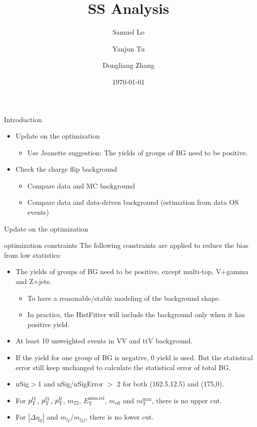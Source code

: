 \documentclass[mathserif,serif]{beamer}
\title[]{SS Analysis}
\author[]
{
Samuel Lo \inst{1}
\and
Yanjun Tu  \inst{1}
\and
Dongliang Zhang  \inst{2}
}
\institute[]
{
\inst{1}
The University of Hong Kong
\and
\inst{2}
University of Michigan
}
\date[]{\today}
\begin{document}
\frame{\titlepage}

\begin{frame}{Introduction}
\begin{itemize}
\item Update on the optimization
\begin{itemize}
\item Use Jeanette suggestion: The yields of groups of BG need to be positive.
\end{itemize}
\item Check the charge flip background
\begin{itemize}
\item Compare data and MC background
\item Compare data and data-driven background (estimation from data OS events)
\end{itemize}
\end{itemize}
\end{frame}

\begin{frame}
\begin{center}
\huge
Update on the optimization
\end{center}
\end{frame}

\begin{frame}{optimization constraints}
\small
The following constraints are applied to reduce the bias from low statistics:
\begin{itemize}
\small
\item The yields of groups of BG need to be positive, except multi-top, V+gamma and Z+jets.
\begin{itemize}
\item To have a reasonable/stable modeling of the background shape.
\item In practice, the HistFitter will include the background only when it has positive yield.
\end{itemize}
\item At least 10 unweighted events in VV and ttV background.
\item If the yield for one group of BG is negative, 0 yield is used. But the statistical error still keep unchanged to calculate the statistical error of total BG.
\item nSig$>$1 and nSig/nSigError $>$ 2 for both (162.5,12.5) and (175,0).
\item For $p_{\text{T}}^{l1}$, $p_{\text{T}}^{l1}$, $p_{\text{T}}^{ll}$, $m_{T2}$, $E_{\text{T}}^{\text{miss,rel}}$, $m_{\text{eff}}$ and $m_{\text{T}}^{\text{max}}$, there is no upper cut.
\item For $|\Delta\eta_{ll}|$ and $m_{lj}$/$m_{ljj}$, there is no lower cut.
\end{itemize}
\end{frame}
\end{document}
